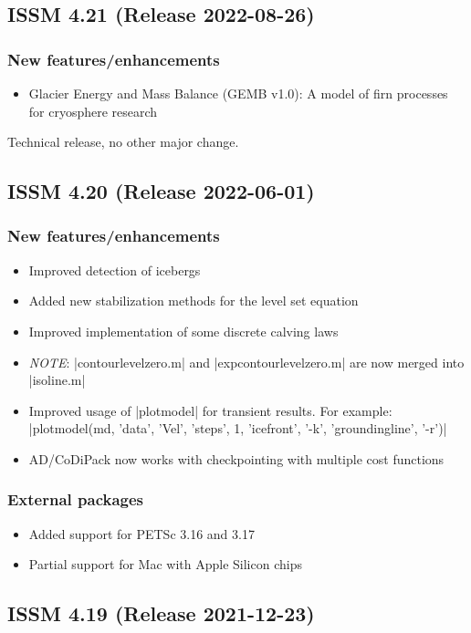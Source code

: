 \subsection*{ISSM 4.21 (Release 2022-08-26)}
\subsubsection{New features/enhancements}
\begin{itemize}
\item Glacier Energy and Mass Balance (GEMB v1.0): A model of firn processes for cryosphere research
\end{itemize}
Technical release, no other major change.

\subsection*{ISSM 4.20 (Release 2022-06-01)}
\subsubsection{New features/enhancements}
\begin{itemize}
\item Improved detection of icebergs
\item Added new stabilization methods for the level set equation
\item Improved implementation of some discrete calving laws
\item \emph{NOTE}: \lstinlinebg|contourlevelzero.m| and \lstinlinebg|expcontourlevelzero.m| are now merged into \lstinlinebg|isoline.m|
\item Improved usage of \lstinlinebg|plotmodel| for transient results. For example: \lstinlinebg|plotmodel(md, 'data', 'Vel', 'steps', 1, 'icefront', '-k', 'groundingline', '-r')|
\item AD/CoDiPack now works with checkpointing with multiple cost functions
\end{itemize}
\subsubsection{External packages}
\begin{itemize}
\item Added support for PETSc 3.16 and 3.17
\item Partial support for Mac with Apple Silicon chips
\end{itemize}

\subsection*{ISSM 4.19 (Release 2021-12-23)}

